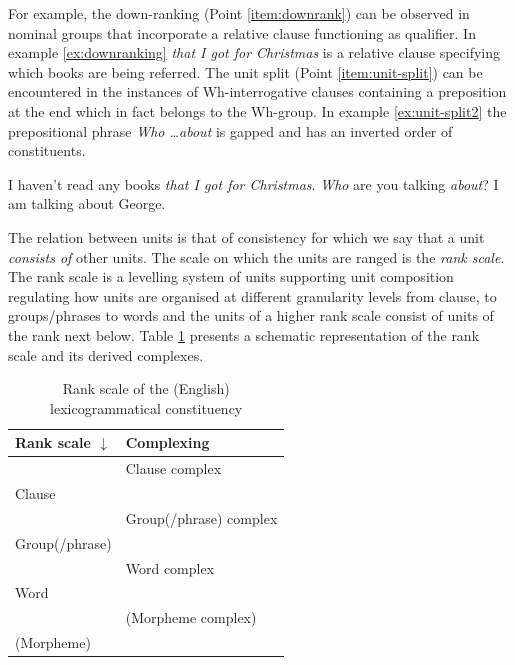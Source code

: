 For example, the down-ranking (Point \ref{item:downrank}) can be observed in nominal groups that incorporate a relative clause functioning as qualifier. In example \ref{ex:downranking} \textit{that I got for Christmas} is a relative clause specifying which books are being referred. The unit split (Point \ref{item:unit-split}) can be encountered in the instances of Wh-interrogative clauses containing a preposition at the end which in fact belongs to the Wh-group. In example \ref{ex:unit-split2} the prepositional phrase \textit{Who \dots about} is gapped and has an inverted order of constituents. 


\begin{exe}
	\ex\label{ex:downranking} I haven't read any books \textit{that I got for Christmas}.
	\ex\label{ex:unit-split2} \textit{Who} are you talking \textit{about}?
	\ex\label{ex:unit-split1} I am talking about George.
\end{exe}

The relation between units is that of consistency for which we say that a unit \textit{consists of} other units. The scale on which the units are ranged is the \textit{rank scale}. The rank scale is a levelling system of units supporting unit composition regulating how units are organised at different granularity levels from clause, to groups/phrases to words and the units of a higher rank scale consist of units of the rank next below. Table \ref{tab:rank-scale} presents a schematic representation of the rank scale and its derived complexes.

\begin{table}[h]
	\centering
	\begin{tabular}{|l|l|}
		\hline
		{\bf Rank scale $\downarrow$} & {\bf Complexing} \\ \hline
		& Clause complex           \\ \hline
		Clause           &                          \\ \hline
		& Group(/phrase) complex   \\ \hline
		Group(/phrase)   &                          \\ \hline
		& Word complex             \\ \hline
		Word             &                          \\ \hline
		& (Morpheme complex)       \\ \hline
		(Morpheme)       &                          \\ \hline
	\end{tabular}
	\caption{Rank scale of the (English) lexicogrammatical constituency}
	\label{tab:rank-scale}
\end{table}


